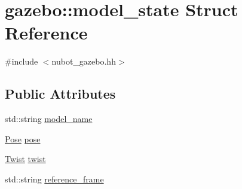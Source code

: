 \hypertarget{structgazebo_1_1model__state}{\section{gazebo\-:\-:model\-\_\-state Struct Reference}
\label{structgazebo_1_1model__state}
}


{\ttfamily \#include $<$nubot\-\_\-gazebo.\-hh$>$}

\subsection*{Public Attributes}
\begin{DoxyCompactItemize}
\item 
std\-::string \hyperlink{structgazebo_1_1model__state_a796837a0feaa387282fac7735cf6cf56}{model\-\_\-name}
\item 
\hyperlink{structgazebo_1_1Pose}{Pose} \hyperlink{structgazebo_1_1model__state_a59c702ff3b33ef414d90cdcb873bad94}{pose}
\item 
\hyperlink{structgazebo_1_1Twist}{Twist} \hyperlink{structgazebo_1_1model__state_a60485b3f1187365afb7fb0105063b4ec}{twist}
\item 
std\-::string \hyperlink{structgazebo_1_1model__state_a22787f252a57adeadc5983b5127c1027}{reference\-\_\-frame}
\end{DoxyCompactItemize}


